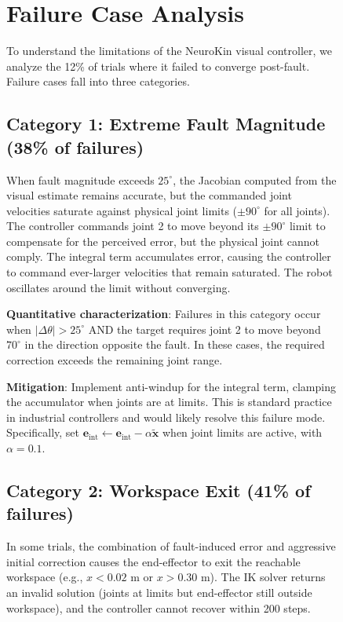 \documentclass[12pt,a4paper,oneside]{report}
\begin{document}
\begin{figure}[H]
\section{Failure Case Analysis}

To understand the limitations of the NeuroKin visual controller, we analyze the 12\% of trials where it failed to converge post-fault. Failure cases fall into three categories.

\subsection{Category 1: Extreme Fault Magnitude (38\% of failures)}

When fault magnitude exceeds $25^\circ$, the Jacobian computed from the visual estimate remains accurate, but the commanded joint velocities saturate against physical joint limits ($\pm90^\circ$ for all joints). The controller commands joint 2 to move beyond its $\pm90^\circ$ limit to compensate for the perceived error, but the physical joint cannot comply. The integral term accumulates error, causing the controller to command ever-larger velocities that remain saturated. The robot oscillates around the limit without converging.

\textbf{Quantitative characterization}: Failures in this category occur when $|\Delta \theta| > 25^\circ$ AND the target requires joint 2 to move beyond $70^\circ$ in the direction opposite the fault. In these cases, the required correction exceeds the remaining joint range.

\textbf{Mitigation}: Implement anti-windup for the integral term, clamping the accumulator when joints are at limits. This is standard practice in industrial controllers and would likely resolve this failure mode. Specifically, set $\mathbf{e}_{\text{int}} \leftarrow \mathbf{e}_{\text{int}} - \alpha \tilde{\mathbf{x}}$ when joint limits are active, with $\alpha = 0.1$.

\subsection{Category 2: Workspace Exit (41\% of failures)}

In some trials, the combination of fault-induced error and aggressive initial correction causes the end-effector to exit the reachable workspace (e.g., $x < 0.02$ m or $x > 0.30$ m). The IK solver returns an invalid solution (joints at limits but end-effector still outside workspace), and the controller cannot recover within 200 steps.


\end{figure}
\end{document}
